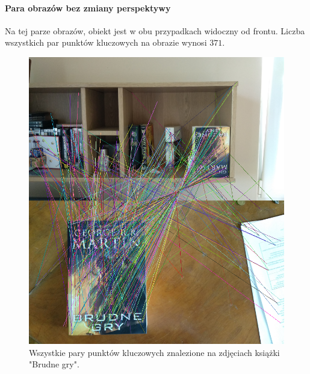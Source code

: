 \documentclass{article}
\begin{document}
	\paragraph{Para obrazów bez zmiany perspektywy}
	Na tej parze obrazów, obiekt jest w obu przypadkach widoczny od frontu. Liczba wszystkich par punktów kluczowych na obrazie wynosi $371$.
	\begin{figure}[H]
		\centering
		\includegraphics[width=0.6\linewidth]{all1trans.png}
		\caption{Wszystkie pary punktów kluczowych znalezione na zdjęciach książki "Brudne gry".}
	\end{figure}
\end{document}
